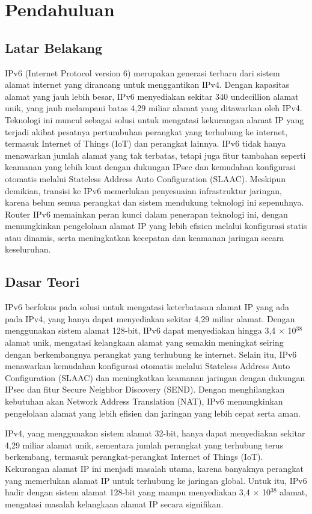 \section{Pendahuluan}
\subsection{Latar Belakang}
IPv6 (Internet Protocol version 6) merupakan generasi terbaru dari sistem alamat internet yang dirancang untuk menggantikan IPv4. Dengan kapasitas alamat yang jauh lebih besar, IPv6 menyediakan sekitar 340 undecillion alamat unik, yang jauh melampaui batas 4,29 miliar alamat yang ditawarkan oleh IPv4. Teknologi ini muncul sebagai solusi untuk mengatasi kekurangan alamat IP yang terjadi akibat pesatnya pertumbuhan perangkat yang terhubung ke internet, termasuk Internet of Things (IoT) dan perangkat lainnya. IPv6 tidak hanya menawarkan jumlah alamat yang tak terbatas, tetapi juga fitur tambahan seperti keamanan yang lebih kuat dengan dukungan IPsec dan kemudahan konfigurasi otomatis melalui Stateless Address Auto Configuration (SLAAC). Meskipun demikian, transisi ke IPv6 memerlukan penyesuaian infrastruktur jaringan, karena belum semua perangkat dan sistem mendukung teknologi ini sepenuhnya. Router IPv6 memainkan peran kunci dalam penerapan teknologi ini, dengan memungkinkan pengelolaan alamat IP yang lebih efisien melalui konfigurasi statis atau dinamis, serta meningkatkan kecepatan dan keamanan jaringan secara keseluruhan.

\subsection{Dasar Teori}
IPv6 berfokus pada solusi untuk mengatasi keterbatasan alamat IP yang ada pada IPv4, yang hanya dapat menyediakan sekitar 4,29 miliar alamat. Dengan menggunakan sistem alamat 128-bit, IPv6 dapat menyediakan hingga 3,4 $\times$ 10$^{38}$ alamat unik, mengatasi kelangkaan alamat yang semakin meningkat seiring dengan berkembangnya perangkat yang terhubung ke internet. Selain itu, IPv6 menawarkan kemudahan konfigurasi otomatis melalui Stateless Address Auto Configuration (SLAAC) dan meningkatkan keamanan jaringan dengan dukungan IPsec dan fitur Secure Neighbor Discovery (SEND). Dengan menghilangkan kebutuhan akan Network Address Translation (NAT), IPv6 memungkinkan pengelolaan alamat yang lebih efisien dan jaringan yang lebih cepat serta aman. 

IPv4, yang menggunakan sistem alamat 32-bit, hanya dapat menyediakan sekitar 4,29 miliar alamat unik, sementara jumlah perangkat yang terhubung terus berkembang, termasuk perangkat-perangkat Internet of Things (IoT). Kekurangan alamat IP ini menjadi masalah utama, karena banyaknya perangkat yang memerlukan alamat IP untuk terhubung ke jaringan global. Untuk itu, IPv6 hadir dengan sistem alamat 128-bit yang mampu menyediakan 3,4 $\times$ 10$^{38}$ alamat, mengatasi masalah kelangkaan alamat IP secara signifikan.

